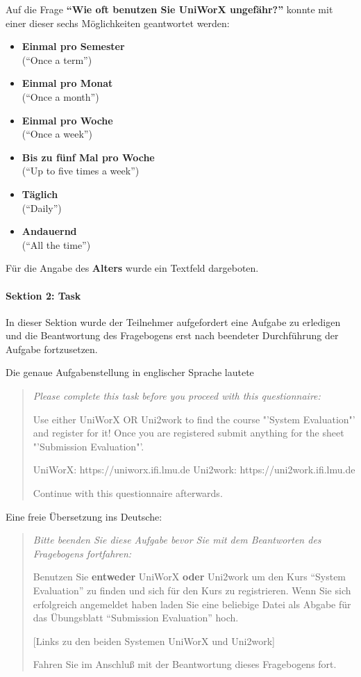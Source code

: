\documentclass[11pt,a4paper,twoside,ngerman]{article}
\begin{document}
Auf die Frage \textbf{"`Wie oft benutzen Sie UniWorX ungefähr?"'} konnte mit einer dieser sechs Möglichkeiten geantwortet werden:

\begin{itemize}
    \item \textbf{Einmal pro Semester} \\ ("`Once a term"')
    \item \textbf{Einmal pro Monat} \\ ("`Once a month"')
    \item \textbf{Einmal pro Woche} \\ ("`Once a week"')
    \item \textbf{Bis zu fünf Mal pro Woche} \\ ("`Up to five times a week"')
    \item \textbf{Täglich} \\ ("`Daily"')
    \item \textbf{Andauernd} \\ ("`All the time"')
\end{itemize}

\bigskip
\noindent
Für die Angabe des \textbf{Alters} wurde ein Textfeld dargeboten.

\paragraph{Sektion 2: Task}
In dieser Sektion wurde der Teilnehmer aufgefordert eine Aufgabe zu erledigen und die Beantwortung des Fragebogens erst nach beendeter Durchführung der Aufgabe fortzusetzen.

Die genaue Aufgabenstellung in englischer Sprache lautete 
\begin{quote}
\itshape 
Please complete this task before you proceed with this questionnaire:

Use either UniWorX OR Uni2work to find the course "'System Evaluation"' and register for it!
Once you are registered submit anything for the sheet "'Submission Evaluation"'.

UniWorX: https://uniworx.ifi.lmu.de
Uni2work: https://uni2work.ifi.lmu.de

Continue with this questionnaire afterwards.
\end{quote}

\noindent
Eine freie Übersetzung ins Deutsche:
\begin{quote}
\itshape
Bitte beenden Sie diese Aufgabe bevor Sie mit dem Beantworten des Fragebogens fortfahren:

Benutzen Sie \textbf{entweder} UniWorX \textbf{oder} Uni2work um den Kurs "`System Evaluation"' zu finden und sich für den Kurs zu registrieren.
Wenn Sie sich erfolgreich angemeldet haben laden Sie eine beliebige Datei als Abgabe für das Übungsblatt "`Submission Evaluation"' hoch.

[Links zu den beiden Systemen UniWorX und Uni2work]

Fahren Sie im Anschluß mit der Beantwortung dieses Fragebogens fort.
\end{quote}
\end{document}
